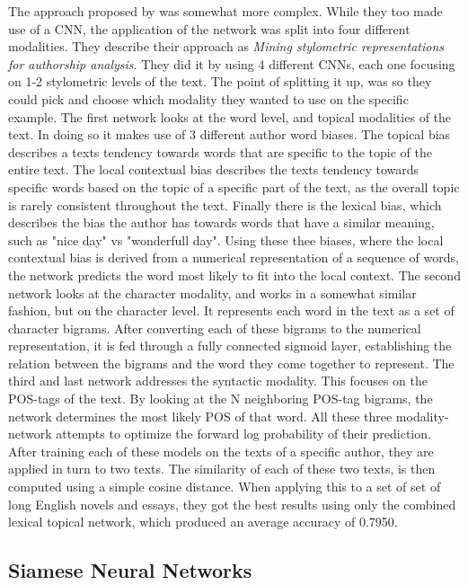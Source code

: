 The approach proposed by \citet{ding2016} was somewhat more complex. While they
too made use of a \gls{CNN}, the application of the network was split into four
different modalities. They describe their approach as \textit{Mining stylometric
representations for authorship analysis}. They did it by using 4 different
\gls{CNN}s, each one focusing on 1-2 stylometric levels of the text. The point
of splitting it up, was so they could pick and choose which modality they wanted
to use on the specific example. The first network looks at the word level,
and topical modalities of the text. In doing so it makes use of 3 different
author word biases. The topical bias describes a texts tendency towards words
that are specific to the topic of the entire text. The local contextual bias
describes the texts tendency towards specific words based on the topic of a
specific part of the text, as the overall topic is rarely consistent throughout
the text. Finally there is the lexical bias, which describes the bias the
author has towards words that have a similar meaning, such as "nice day" vs
"wonderfull day". Using these thee biases, where the local contextual bias is
derived from a numerical representation of a sequence of words, the network
predicts the word most likely to fit into the local context. The second network
looks at the character modality, and works in a somewhat similar fashion,
but on the character level. It represents each word in the text as a set of
character bigrams. After converting each of these bigrams to the numerical
representation, it is fed through a fully connected sigmoid layer, establishing
the relation between the bigrams and the word they come together to represent.
The third and last network addresses the syntactic modality. This focuses on
the \gls{POS}-tags of the text. By looking at the N neighboring \gls{POS}-tag
bigrams, the network determines the most likely \gls{POS} of that word. All
these three modality-network attempts to optimize the forward log probability of
their prediction. After training each of these models on the texts of a specific
author, they are applied in turn to two texts. The similarity of each of these
two texts, is then computed using a simple cosine distance. When applying this
to a set of set of long English novels and essays, they got the best results
using only the combined lexical topical network, which produced an average
accuracy of 0.7950.


\subsection{Siamese Neural Networks}


